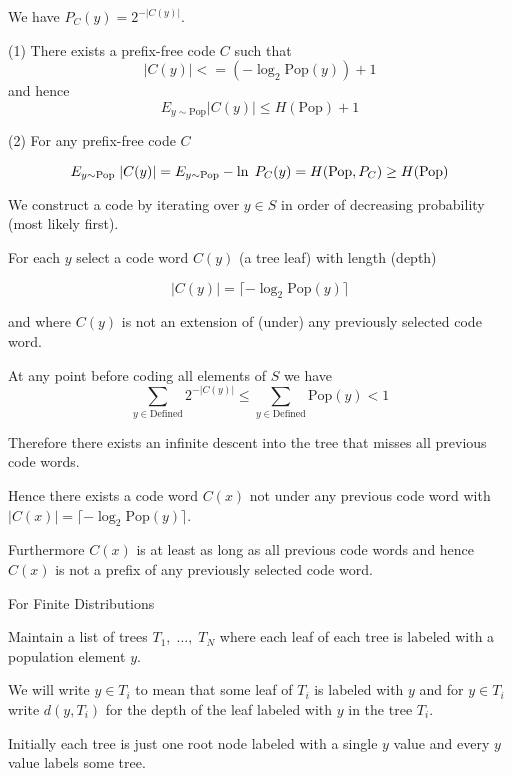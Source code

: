 \vfill
We have $P_C(y) = 2^{-|C(y)|}$.


(1) There exists a prefix-free code $C$ such that
$$|C(y)| <= (- \log_2 \mathrm{Pop}(y)) + 1$$
and hence
$$E_{y\sim \mathrm{Pop}} |C(y)| \leq H(\mathrm{Pop}) +1$$

\vfill
(2) For any prefix-free code $C$

$$E_{y \sim \mathrm{Pop}}\;|C(y)| = E_{y \sim \mathrm{Pop}} -\ln \;P_C(y) = H(\mathrm{Pop},P_C) \geq H(\mathrm{Pop})$$


\vfill
We construct a code by iterating over $y \in S$ in order of decreasing probability (most likely first).

\vfill
For each $y$ select a code word $C(y)$ (a tree leaf) with length (depth)

\vfill
$$|C(y)| = \lceil - \log_2 \mathrm{Pop}(y)\rceil$$

\vfill
and where $C(y)$ is not an extension of (under) any previously selected code word.


At any point before coding all elements of $S$ we have
$$\sum_{y \in \mathrm{Defined}} 2^{-|C(y)|} \leq \sum_{y \in \mathrm{Defined}} \mathrm{Pop}(y) < 1$$

\vfill
Therefore there exists an infinite descent into the tree that misses all previous code words.

\vfill
Hence there exists a code word $C(x)$ not under any previous code word with
$|C(x)| = \lceil - \log_2 \mathrm{Pop}(y)\rceil$.

\vfill
Furthermore $C(x)$ is at least as long as all previous code words and hence $C(x)$ is not a prefix of any previously selected code word.

{For Finite Distributions}

Maintain a list of trees $T_1,\;\dots,\;T_N$ where each leaf of each tree is labeled with a population element $y$.

\vfill
We will write $y \in T_i$ to mean that some leaf of $T_i$ is labeled with $y$ and for $y \in T_i$ write $d(y,T_i)$ for the depth
of the leaf labeled with $y$ in the tree $T_i$.

\vfill
Initially each tree is just one root node labeled with a single $y$ value and every $y$ value labels some tree.


